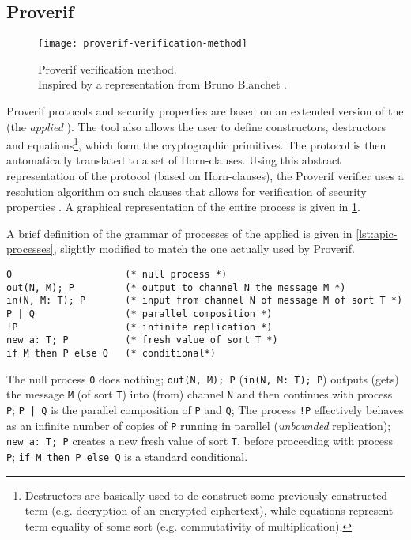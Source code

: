 \subsection{Proverif}
\begin{figure}[t]
    \texttt{[image: proverif-verification-method]}
    \centering
    \caption{Proverif verification method.\\Inspired by a representation from Bruno Blanchet \cite{SymbolicComputationalBlanchet}.}
    \label{fig:proverif-verification-method}
\end{figure}
Proverif protocols and security properties are based on an extended version of the \pic (the \textit{applied} \picnospace). The tool also allows the user to define constructors, destructors and equations\footnote{Destructors are basically used to de-construct some previously constructed term (e.g. decryption of an encrypted ciphertext), while equations represent term equality of some sort (e.g. commutativity of multiplication).}, which form the cryptographic primitives. The protocol is then automatically translated to a set of Horn-clauses. Using this abstract representation of the protocol (based on Horn-clauses), the Proverif verifier uses a resolution algorithm on such clauses that allows for verification of security properties \cite{SymbolicComputationalBlanchet}.
A graphical representation of the entire process is given in \cref{fig:proverif-verification-method}.

A brief definition of the grammar of processes of the applied \pic is given in \cref{lst:apic-processes}, slightly modified to match the one actually used by Proverif.

\lstset{language=proverif}
\begin{lstlisting}[caption={Applied \pic grammar of processes.}, label={lst:apic-processes}]
0                    (* null process *)
out(N, M); P         (* output to channel N the message M *)
in(N, M: T); P       (* input from channel N of message M of sort T *)
P | Q                (* parallel composition *)
!P                   (* infinite replication *)
new a: T; P          (* fresh value of sort T *)
if M then P else Q   (* conditional*)
\end{lstlisting}

\lstset{language=proverif}
The null process \lstinline{0} does nothing;
\lstinline{out(N, M); P} (\lstinline{in(N, M: T); P}) outputs (gets) the message \lstinline{M} (of sort \lstinline{T}) into (from) channel \lstinline{N} and then continues with process \lstinline{P};
\lstinline{P | Q} is the parallel composition of \lstinline{P} and \lstinline{Q};
The process \lstinline{!P} effectively behaves as an infinite number of copies of \lstinline{P} running in parallel (\textit{unbounded} replication);
\lstinline{new a: T; P} creates a new fresh value of sort \lstinline{T}, before proceeding with process \lstinline{P};
\lstinline{if M then P else Q} is a standard conditional.

